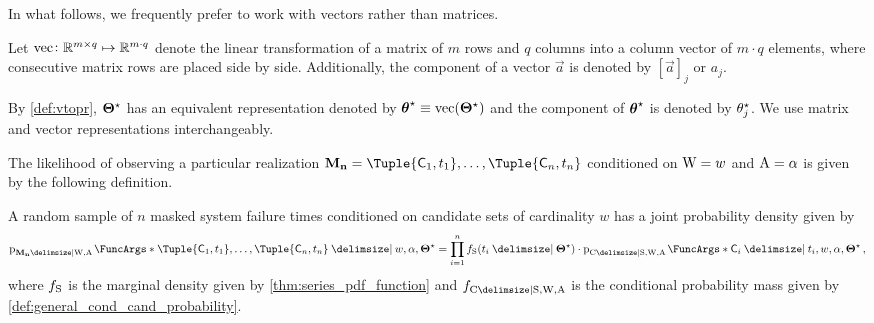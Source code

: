 \documentclass[
    11pt,
    extrafontsizes,
    article,
    oldfontcommands,
    final,
    oneside,
    openany,
    hidelinks]{memoir}
\begin{document}
In what follows, we frequently prefer to work with vectors rather than matrices.
\begin{definition}
\label{def:vtopr}
Let $\operatorname{vec} \colon \mathbb{R}^{m \times q} \mapsto \mathbb{R}^{m \cdot q}$ denote the linear transformation of a matrix of $m$ rows and $q$ columns into a column vector of $m \cdot q$ elements, where consecutive matrix rows are placed side by side.
Additionally, the \jth component of a vector $\vec{a}$ is denoted by $\left[\vec{a}\right]_j$ or $a_j$.
\end{definition}
\begin{notation}
By \cref{def:vtopr}, ${\boldsymbol{\Theta}}^{\star}$ has an equivalent representation denoted by ${\boldsymbol{\mathbf{\theta}}}^{\star} \equiv \operatorname{vec}\!\left({\boldsymbol{\Theta}}^{\star}\right)$ and the \jth component of ${\boldsymbol{\mathbf{\theta}}}^{\star}$ is denoted by ${\theta}^{\star}_j$.
We use matrix and vector representations interchangeably.
\end{notation}







The likelihood of observing a particular realization $\mfs = \Tuple{\cand_1,t_1},\ldots,\Tuple{\cand_n,t_n}$ conditioned on $\mathrm{W} = w$ and $\mathrm{A} = \alpha$ is given by the following definition.
\begin{definition}
	\label{def:msft_joint_pdf}
	A random sample of $n$ masked system failure times conditioned on candidate sets of cardinality $w$ has a joint probability density given by
	\begin{equation}
	\label{eq:msft_joint_pdf}
	\PDF{\Tuple{\cand_1,t_1},\ldots,\Tuple{\cand_n,t_n} \Given w, \alpha, \tparam{\sysparam}}[\mfs \Given \RV{W}, \RV{A}] =
	\prod_{i=1}^{n} \spdf(t_i \Given \tparam\sysparam) \cdot \PDF{\cand_i \Given t_i, w, \alpha, \tparam\sysparam}[\rvcand \Given \sv, \RV{W}, \RV{A}]\,,
	\end{equation}
	where $f_{\mathrm{S}}$ is the marginal density given by \cref{thm:series_pdf_function} and $\pdf_{\rvcand \Given \sv, \RV{W}, \RV{A}}$ is the conditional probability mass given by \cref{def:general_cond_cand_probability}.
\end{definition}
\end{document}
